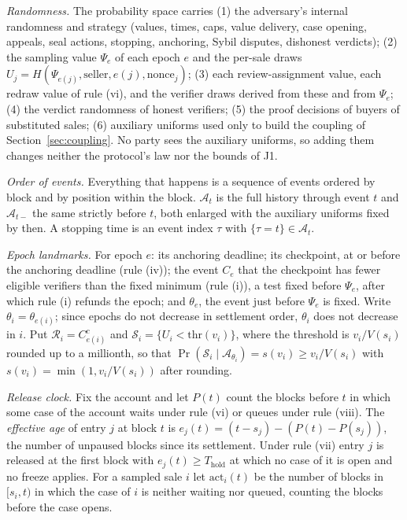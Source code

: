 \documentclass[10pt,a4paper]{article}
\newcommand{\Thold}{T_{\mathrm{hold}}}
\newcommand{\cA}{\mathcal{A}}
\newcommand{\cR}{\mathcal{R}}
\newcommand{\cS}{\mathcal{S}}
\theoremstyle{plain}
\theoremstyle{remark}
\begin{document}
\emph{Randomness.} The probability space carries (1) the adversary's internal randomness and strategy (values, times, caps, value delivery, case opening, appeals, seal actions, stopping, anchoring, Sybil disputes, dishonest verdicts); (2) the sampling value $\Psi_e$ of each epoch $e$ and the per-sale draws $U_j=H(\Psi_{e(j)},\text{seller},e(j),\text{nonce}_j)$; (3) each review-assignment value, each redraw value of rule (vi), and the verifier draws derived from these and from $\Psi_e$; (4) the verdict randomness of honest verifiers; (5) the proof decisions of buyers of substituted sales; (6) auxiliary uniforms used only to build the coupling of Section~\ref{sec:coupling}. No party sees the auxiliary uniforms, so adding them changes neither the protocol's law nor the bounds of J1.

\emph{Order of events.} Everything that happens is a sequence of events ordered by block and by position within the block. $\cA_t$ is the full history through event $t$ and $\cA_{t-}$ the same strictly before $t$, both enlarged with the auxiliary uniforms fixed by then. A stopping time is an event index $\tau$ with $\{\tau=t\}\in\cA_t$.

\emph{Epoch landmarks.} For epoch $e$: its anchoring deadline; its checkpoint, at or before the anchoring deadline (rule (iv)); the event $C_e$ that the checkpoint has fewer eligible verifiers than the fixed minimum (rule (i)), a test fixed before $\Psi_e$, after which rule (i) refunds the epoch; and $\theta_e$, the event just before $\Psi_e$ is fixed. Write $\theta_i=\theta_{e(i)}$; since epochs do not decrease in settlement order, $\theta_i$ does not decrease in $i$. Put $\cR_i=C_{e(i)}^c$ and $\cS_i=\{U_i<\mathrm{thr}(v_i)\}$, where the threshold is $v_i/V(s_i)$ rounded up to a millionth, so that $\Pr(\cS_i\mid\cA_{\theta_i})=s(v_i)\ge v_i/V(s_i)$ with $s(v_i)=\min(1,v_i/V(s_i))$ after rounding.

\emph{Release clock.} Fix the account and let $P(t)$ count the blocks before $t$ in which some case of the account waits under rule (vi) or queues under rule (viii). The \emph{effective age} of entry $j$ at block $t$ is $e_j(t)=(t-s_j)-(P(t)-P(s_j))$, the number of unpaused blocks since its settlement. Under rule (vii) entry $j$ is released at the first block with $e_j(t)\ge\Thold$ at which no case of it is open and no freeze applies. For a sampled sale $i$ let $\mathrm{act}_i(t)$ be the number of blocks in $[s_i,t)$ in which the case of $i$ is neither waiting nor queued, counting the blocks before the case opens.
\end{document}
